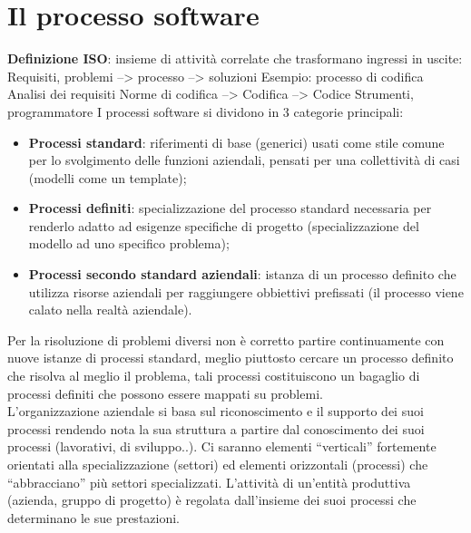 \section{Il processo software}
\textbf{Definizione ISO}: insieme di attività correlate che trasformano ingressi in uscite:
{\center Requisiti, problemi --> processo --> soluzioni}
Esempio: processo di codifica Analisi dei requisiti
Norme di codifica --> Codifica --> Codice Strumenti, programmatore
I processi software si dividono in 3 categorie principali:
\begin{itemize}
\item \textbf{Processi standard}: riferimenti di base (generici) usati come stile comune per lo svolgimento delle
funzioni aziendali, pensati per una collettività di casi (modelli come un template);
\item \textbf{Processi definiti}: specializzazione del processo standard necessaria per renderlo adatto ad esigenze specifiche di progetto (specializzazione del modello ad uno specifico problema);
\item \textbf{Processi secondo standard aziendali}: istanza di un processo definito che utilizza risorse aziendali per raggiungere obbiettivi prefissati (il processo viene calato nella realtà aziendale).
\end{itemize}

Per la risoluzione di problemi diversi non è corretto partire continuamente con nuove istanze di processi standard, meglio piuttosto cercare un processo definito che risolva al meglio il problema, tali processi costituiscono un bagaglio di processi definiti che possono essere mappati su problemi.\\
L'organizzazione aziendale si basa sul riconoscimento e il supporto dei suoi processi rendendo nota la sua struttura a partire dal conoscimento dei suoi processi (lavorativi, di sviluppo..). Ci saranno elementi ``verticali'' fortemente orientati alla specializzazione (settori) ed elementi orizzontali (processi) che ``abbracciano'' più settori specializzati. L'attività di un'entità produttiva (azienda, gruppo di progetto) è regolata dall'insieme dei suoi processi che determinano le sue prestazioni.

